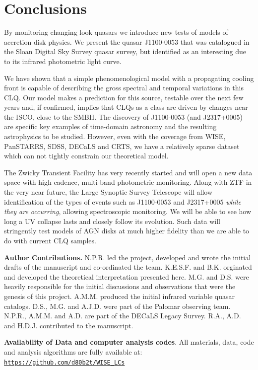 \documentclass[a4paper,fleqn,usenatbib]{mnras}
\begin{document}
\section{Conclusions} 
By monitoring changing look quasars we introduce new tests of models
of accretion disk physics. We present the quasar J1100-0053 that was
catalogued in the Sloan Digital Sky Survey quasar survey, but
identified as an interesting due to its infrared photometric light
curve.

We have shown that a simple phenomenological model with a propagating
cooling front is capable of describing the gross spectral and temporal
variations in this CLQ. Our model makes a prediction for this source,
testable over the next few years and, if confirmed, implies that CLQs
as a class are driven by changes near the ISCO, close to the SMBH. The
discovery of J1100-0053 (and J2317+0005) are specific key examples of
time-domain astronomy and the resulting astrophysics to be
studied. However, even with the coverage from WISE, PanSTARRS, SDSS,
DECaLS and CRTS, we have a relatively sparse dataset which can not
tightly constrain our theoretical model.

The Zwicky Transient
Facility \citep[ZTF; ][]{Bellm2014} has very recently started and will
open a new data space with high cadence, multi-band photometric
monitoring. Along with ZTF in the very near future, the Large Synoptic
Survey Telescope \citep{Ivezic2008, LSST_ScienceBookV2} will allow
identification of the types of events such as J1100-0053 and
J2317+0005 \emph{while they are occurring}, allowing spectroscopic
monitoring. We will be able to see how long a UV collapse lasts and
closely follow its evolution.  Such data will stringently test models
of AGN disks at much higher fidelity than we are able to do with
current CLQ samples.

\smallskip
\smallskip
\noindent
{\bf Author Contributions.}   
N.P.R. led the project, developed and wrote the initial drafts of the manuscript and co-ordinated the team.
K.E.S.F. and B.K. orginated and developed the theoretical interpretation presented here. 
M.G. and D.S. were heavily responsible for the initial discussions and observations that were the genesis of
this project. A.M.M. produced the initial infrared variable quasar catalogs.  
D.S., M.G. and A.J.D. were part of the Palomar observing team.
N.P.R., A.M.M. and A.D. are part of the DECaLS Legacy Survey. 
R.A., A.D. and H.D.J. contributed to the manuscript.

\smallskip
\smallskip
\noindent
{\bf Availability of Data and computer analysis codes}. 
All materials, data, code and analysis algorithms are fully 
available at: 
\href{https://github.com/d80b2t/WISE\_LCs}{\tt https://github.com/d80b2t/WISE\_LCs}
\end{document}
